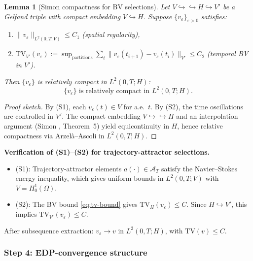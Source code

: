 \documentclass[12pt,a4paper]{article}
\theoremstyle{definition}
\theoremstyle{plain}
\newtheorem{lemma}[definition]{Lemma}
\theoremstyle{remark}
\begin{document}
\begin{lemma}[Simon compactness for BV selections]\label{lem:simon-bv}
Let $V \hookrightarrow\!\!\!\hookrightarrow H \hookrightarrow V'$ be a Gelfand triple with compact embedding $V \hookrightarrow H$. Suppose $\{v_\varepsilon\}_{\varepsilon > 0}$ satisfies:
\begin{enumerate}
\item[\textup{(S1)}] $\|v_\varepsilon\|_{L^2(0,T;V)} \leq C_1$ \quad (spatial regularity),
\item[\textup{(S2)}] $\mathrm{TV}_{V'}(v_\varepsilon) := \sup_{\text{partitions}} \sum_i \|v_\varepsilon(t_{i+1}) - v_\varepsilon(t_i)\|_{V'} \leq C_2$ \quad (temporal BV in $V'$).
\end{enumerate}
Then $\{v_\varepsilon\}$ is relatively compact in $L^2(0,T;H)$:
\begin{equation}\label{eq:aubin-lions}
  \{v_\varepsilon\} \text{ is relatively compact in } L^2(0,T;H).
\end{equation}
\end{lemma}

\begin{proof}[Proof sketch]
By (S1), each $v_\varepsilon(t) \in V$ for a.e.~$t$. By (S2), the time oscillations are controlled in $V'$. The compact embedding $V \hookrightarrow\!\!\!\hookrightarrow H$ and an interpolation argument (Simon \cite{Simon1987}, Theorem~5) yield equicontinuity in $H$, hence relative compactness via Arzel\`a--Ascoli in $L^2(0,T;H)$.
\end{proof}

\noindent\textbf{Verification of (S1)--(S2) for trajectory-attractor selections.}
\begin{itemize}
\item (S1): Trajectory-attractor elements $a(\cdot) \in \mathcal{A}_T$ satisfy the Navier--Stokes energy inequality, which gives uniform bounds in $L^2(0,T;V)$ with $V = H^1_0(\Omega)$.
\item (S2): The BV bound \eqref{eq:tv-bound} gives $\mathrm{TV}_H(v_\varepsilon) \leq C$. Since $H \hookrightarrow V'$, this implies $\mathrm{TV}_{V'}(v_\varepsilon) \leq C$.
\end{itemize}
After subsequence extraction: $v_\varepsilon \to v$ in $L^2(0,T;H)$, with $\mathrm{TV}(v) \leq C$.

\subsubsection*{Step 4: EDP-convergence structure}
\end{document}
